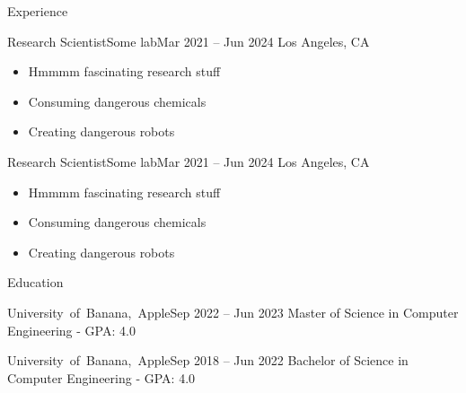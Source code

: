 \documentclass[]{../mcdowellcv}
\begin{document}
\makeheader

\begin{cvsection}{Experience}

    \begin{cvsubsection}{Research Scientist}{Some lab}{Mar 2021 -- Jun 2024}
        Los Angeles, CA
        \vspace{2.5mm}
        \begin{itemize}
            \item Hmmmm fascinating research stuff
            \item Consuming dangerous chemicals
            \item Creating dangerous robots
        \end{itemize}
    \end{cvsubsection}
    
    \begin{cvsubsection}{Research Scientist}{Some lab}{Mar 2021 -- Jun 2024}
        Los Angeles, CA
        \vspace{2.5mm}
        \begin{itemize}
            \item Hmmmm fascinating research stuff
            \item Consuming dangerous chemicals
            \item Creating dangerous robots
        \end{itemize}
    \end{cvsubsection}
    
\end{cvsection}

\begin{cvsection}{Education}

    \begin{cvsubsection}{\mbox {University of Banana, Apple}}{}{Sep 2022 -- Jun 2023}
        Master of Science in Computer Engineering - GPA: 4.0
    \end{cvsubsection}
    
    \begin{cvsubsection}{\mbox {University of Banana, Apple}}{}{Sep 2018 -- Jun 2022}
        Bachelor of Science in Computer Engineering - GPA: 4.0
    \end{cvsubsection}
     
\end{cvsection}
\end{document}
